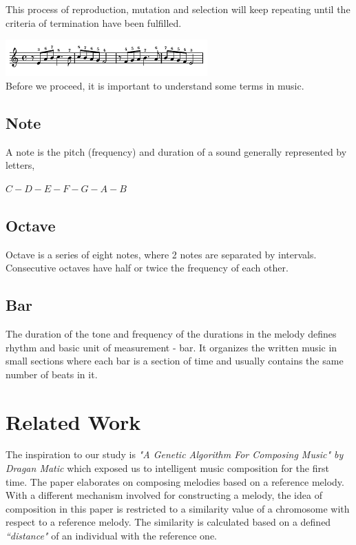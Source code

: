 \documentclass[conference]{IEEEtran}
\begin{document}
This process of reproduction, mutation and selection will keep repeating until the criteria of termination have been fulfilled.

\includegraphics{music.png}\\

Before we proceed, it is important to understand some terms in music.

\subsection{Note}
A note is the pitch (frequency) and duration of a sound generally represented by letters,
\begin{center}
    $C-D-E-F-G-A-B$
\end{center}

\subsection{Octave}
Octave is a series of eight notes, where 2 notes are separated by intervals. Consecutive octaves have half or twice the frequency of each other.

\subsection{Bar}
The duration of the tone and frequency of the durations in the melody defines rhythm and basic unit of measurement - bar. It organizes the written music in small sections where each bar is a section of time and usually contains the same number of beats in it.



\section{Related Work}
The inspiration to our study is \textit{"A Genetic Algorithm For Composing Music" by Dragan Matic} \cite{b1} which exposed us to intelligent music composition for the first time. The paper elaborates on composing melodies based on a reference melody. With a different mechanism involved for constructing a melody, the idea of composition in this paper is restricted to a similarity value of a chromosome with respect to a reference melody. The similarity is calculated based on a defined \textit{``distance"} of an individual with the reference one.
\end{document}
